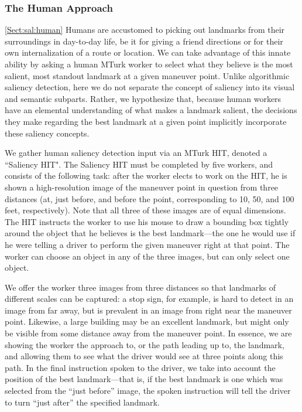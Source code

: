 \subsubsection{The Human Approach}\ref{Sect:sal:human}
Humans are accustomed to picking out landmarks from their surroundings in day-to-day life, be it for giving a friend directions or for their own internalization of a route or location. We can take advantage of this innate ability by asking a human MTurk worker to select what they believe is the most salient, most standout landmark at a given maneuver point. Unlike algorithmic saliency detection, here we do not separate the concept of saliency into its visual and semantic subparts. Rather, we hypothesize that, because human workers have an elemental understanding of what makes a landmark salient, the decisions they make regarding the best landmark at a given point implicitly incorporate these saliency concepts.

We gather human saliency detection input via an MTurk HIT, denoted a ``Saliency HIT". The Saliency HIT must be completed by five workers, and consists of the following task: after the worker elects to work on the HIT, he is shown a high-resolution image of the maneuver point in question from three distances (at, just before, and before the point, corresponding to 10, 50, and 100 feet, respectively). Note that all three of these images are of equal dimensions. The HIT instructs the worker to use his mouse to draw a bounding box tightly around the object that he believes is the best landmark---the one he would use if he were telling a driver to perform the given maneuver right at that point. The worker can choose an object in any of the three images, but can only select one object.

We offer the worker three images from three distances so that landmarks of different scales can be captured: a stop sign, for example, is hard to detect in an image from far away, but is prevalent in an image from right near the maneuver point. Likewise, a large building may be an excellent landmark, but might only be visible from some distance away from the maneuver point. In essence, we are showing the worker the approach to, or the path leading up to, the landmark, and allowing them to see what the driver would see at three points along this path. In the final instruction spoken to the driver, we take into account the position of the best landmark---that is, if the best landmark is one which was selected from the “just before” image, the spoken instruction will tell the driver to turn “just after” the specified landmark.

